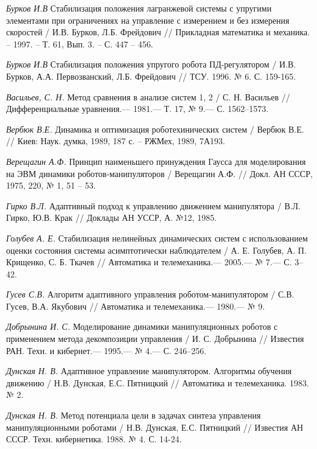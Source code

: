 \begin{thebibliography}{10}
	{\it Бурков И.В} Стабилизация положения лагранжевой системы с упругими элементами при ограничениях на управление с измерением и без 			измерения скоростей / И.В. Бурков, Л.Б. Фрейдович // Прикладная математика и механика. – 1997. – Т. 61, Вып. 3. – С. 447 – 456.
	
	{\it Бурков И.В} Стабилизация положения упругого робота ПД-регулятором / И.В. Бурков, А.А. Первозванский, Л.Б. Фрейдович // ТСУ. 1996. № 6. С. 159-165.
	
	{\it Васильев, С. Н.} Метод сравнения в анализе систем 1, 2 / С. Н. Васильев // Дифференциальные уравнения.— 1981.— Т. 17, № 9.— С. 1562–1573.
	
	{\it Вербюк В.Е.} Динамика и оптимизация роботехинических систем / Вербюк В.Е. // Киев: Наук. думка, 1989, 187 с. – РЖМех, 1989, 7А193.
	
	{\it Верещагин А.Ф.} Принцип наименьшего принуждения Гаусса для моделирования на ЭВМ динамики роботов-манипуляторов / Верещагин А.Ф. // Докл. АН 	СССР, 1975, 220, № 1, 51 – 53.
	
	{\it Гирко В.Л.} Адаптивный подход к управлению движением манипулятора / В.Л. Гирко, Ю.В. Крак // Доклады АН УССР, А. №12, 1985.
	
	{\it Голубев А. Е.} Стабилизация нелинейных динамических систем с использованием оценки состояния системы асимптотически наблюдателем / А. Е. 		Голубев, А. П. Крищенко, С. Б. Ткачев // Автоматика и телемеханика.— 2005.— № 7.— С. 3–42.
	
	{\it Гусев С.В.} Алгоритм адаптивного управления роботом-манипулятором / С.В. Гусев, В.А. Якубович // Автоматика и телемеханика.— 1980.— № 9.
	
	{\it Добрынина И. С.} Моделирование динамики манипуляционных роботов с применением метода декомпозиции управления / И. С. Добрынина // Известия РАН. Техн. и кибернет.— 1995.— № 4.— С. 246–256.

	{\it Дунская Н. В.} Адаптивное управление манипулятором. Алгоритмы обучения движению / Н.В. Дунская, Е.С. Пятницкий // Автоматика и телемеханика. 1983. № 2. 
	
	{\it Дунская Н. В.} Метод потенциала цели в задачах синтеза управления манипуляционными роботами / Н.В. Дунская, Е.С. Пятницкий // Известия АН СССР. Техн. кибернетика. 1988. № 4. С. 14-24.
	

\end{thebibliography}

